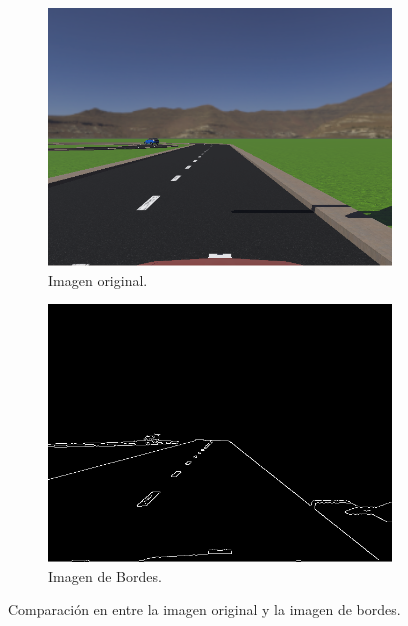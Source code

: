 \begin{figure}[h]
    \centering
    \begin{subfigure}[b]{0.4\textwidth}
         \centering
         \includegraphics[width=\textwidth]{Figures/Figures_Cap04/lanes.png}
         \caption{Imagen original.}
         \label{fig:lanes}
    \end{subfigure}
    \hfill
    \begin{subfigure}[b]{0.4\textwidth}
         \centering
         \includegraphics[width=\textwidth]{Figures/Figures_Cap04/edge_lanes.png}
         \caption{Imagen de Bordes.}
         \label{fig:edges_lanes}
     \end{subfigure}
     
    \caption{Comparación en entre la imagen original y la imagen de bordes.}
    \label{fig:lanes_comparsion}
\end{figure}

